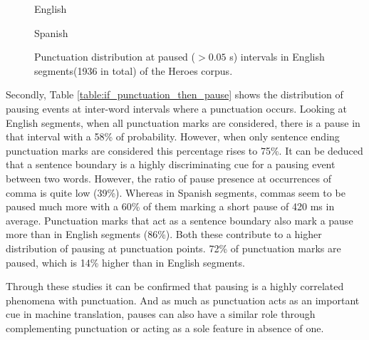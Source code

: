 \begin{figure}[h]
\begin{minipage}{0.5\textwidth}
    \end{minipage}
    \begin{minipage}{.5\textwidth}
        \centering
        English
    \end{minipage}%
    \begin{minipage}{0.5\textwidth}
        \centering
        Spanish
    \end{minipage}
\label{figure:if_pause_then_punctuation}
\caption{Punctuation distribution at paused ($ > 0.05$ s) intervals in English segments(1936 in total) of the Heroes corpus.}
\end{figure}

Secondly, Table \ref{table:if_punctuation_then_pause} shows the distribution of pausing events at inter-word intervals where a punctuation occurs. Looking at English segments, when all punctuation marks are considered, there is a pause in that interval with a 58\% of probability. However, when only sentence ending punctuation marks are considered this percentage rises to 75\%. It can be deduced that a sentence boundary is a highly discriminating cue for a pausing event between two words. However, the ratio of pause presence at occurrences of comma is quite low (39\%). Whereas in Spanish segments, commas seem to be paused much more with a 60\% of them marking a short pause of 420 ms in average. Punctuation marks that act as a sentence boundary also mark a pause more than in English segments (86\%). Both these contribute to a higher distribution of pausing at punctuation points. 72\% of punctuation marks are paused, which is 14\% higher than in English segments. 

Through these studies it can be confirmed that pausing is a highly correlated phenomena with punctuation. And as much as punctuation acts as an important cue in machine translation, pauses can also have a similar role through complementing punctuation or acting as a sole feature in absence of one. 

